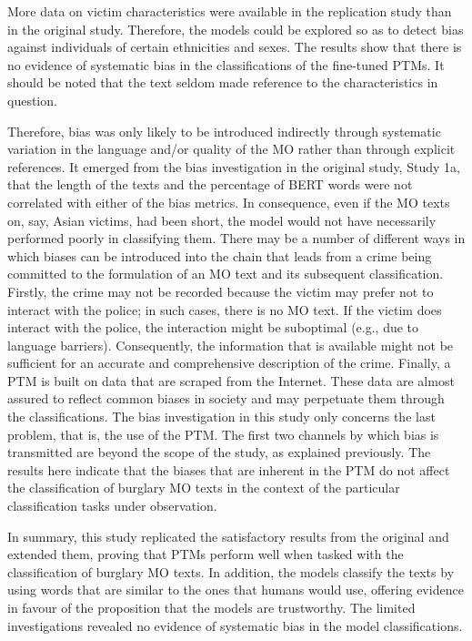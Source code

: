 More data on victim characteristics were available in the replication study than in the original study. Therefore, the models could be explored so as to detect bias against individuals of certain ethnicities and sexes. The results show that there is no evidence of systematic bias in the classifications of the fine-tuned PTMs. It should be noted that the text seldom made reference to the characteristics in question.

Therefore, bias was only likely to be introduced indirectly through systematic variation in the language and/or quality of the MO rather than through explicit references. It emerged from the bias investigation in the original study, Study 1a, that the length of the texts and the percentage of BERT words were not correlated with either of the bias metrics. In consequence, even if the MO texts on, say, Asian victims, had been short, the model would not have necessarily performed poorly in classifying them.
There may be a number of different ways in which biases can be introduced into the chain that leads from a crime being committed to the formulation of an MO text and its subsequent classification. Firstly, the crime may not be recorded because the victim may prefer not to interact with the police; in such cases, there is no MO text. If the victim does interact with the police, the interaction might be suboptimal (e.g., due to language barriers). Consequently, the information that is available might not be sufficient for an accurate and comprehensive description of the crime. Finally, a PTM is built on data that are scraped from the Internet. These data are almost assured to reflect common biases in society and may perpetuate them through the classifications. The bias investigation in this study only concerns the last problem, that is, the use of the PTM. The first two channels by which bias is transmitted are beyond the scope of the study, as explained previously. The results here indicate that the biases that are inherent in the PTM do not affect the classification of burglary MO texts in the context of the particular classification tasks under observation.

In summary, this study replicated the satisfactory results from the original and extended them, proving that PTMs perform well when tasked with the classification of burglary MO texts. In addition, the models classify the texts by using words that are similar to the ones that humans would use, offering evidence in favour of the proposition that the models are trustworthy. The limited investigations revealed no evidence of systematic bias in the model classifications.


